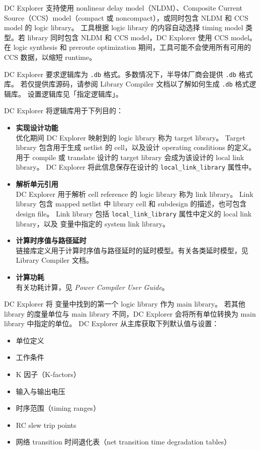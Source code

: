 DC Explorer 支持使用 nonlinear delay model（NLDM）、Composite Current Source（CCS）model（compact 或 noncompact），或同时包含 NLDM 和 CCS model 的 logic library。
工具根据 logic library 的内容自动选择 timing model 类型。若 library 同时包含 NLDM 和 CCS model，DC Explorer 使用 CCS model。
在 logic synthesis 和 preroute optimization 期间，工具可能不会使用所有可用的 CCS 数据，以缩短 runtime。

DC Explorer 要求逻辑库为 \texttt{.db} 格式。多数情况下，半导体厂商会提供 \texttt{.db} 格式库。
若仅提供库源码，请参阅 Library Compiler 文档以了解如何生成 \texttt{.db} 格式逻辑库。
设置逻辑库见「指定逻辑库」。

DC Explorer 将逻辑库用于下列目的：
\begin{itemize}
  \item \textbf{实现设计功能}\\
        优化期间 DC Explorer 映射到的 logic library 称为 target library。
        Target library 包含用于生成 netlist 的 cell，以及设计 operating conditions 的定义。
        用于 compile 或 translate 设计的 target library 会成为该设计的 local link library。
        DC Explorer 将此信息保存在设计的 \texttt{local\_link\_library} 属性中。

  \item \textbf{解析单元引用}\\
        DC Explorer 用于解析 cell reference 的 logic library 称为 link library。
        Link library 包含 mapped netlist 中 library cell 和 subdesign 的描述，也可包含 design file。
        Link library 包括 \texttt{local\_link\_library} 属性中定义的 local link library，以及  变量中指定的 system link library。

  \item \textbf{计算时序值与路径延时}\\
        链接库定义用于计算时序值与路径延时的延时模型。有关各类延时模型，见 Library Compiler 文档。

  \item \textbf{计算功耗}\\
        有关功耗计算，见 \textit{Power Compiler User Guide}。
\end{itemize}

DC Explorer 将  变量中找到的第一个 logic library 作为 main library。
若其他 library 的度量单位与 main library 不同，DC Explorer 会将所有单位转换为 main library 中指定的单位。
DC Explorer 从主库获取下列默认值与设置：
\begin{itemize}
  \item 单位定义
  \item 工作条件
  \item K 因子（K-factors）
  \item 输入与输出电压
  \item 时序范围（timing ranges）
  \item RC slew trip points
  \item 网络 transition 时间退化表（net transition time degradation tables）
\end{itemize}

